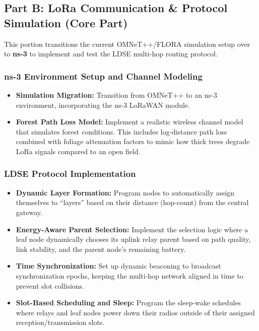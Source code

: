 \subsection*{Part B: LoRa Communication \& Protocol Simulation (Core Part)}

This portion transitions the current OMNeT++/FLORA simulation setup over to
\textbf{ns-3} to implement and test the LDSE multi-hop routing protocol.

\subsubsection{ns-3 Environment Setup and Channel Modeling}

\begin{itemize}
    \item \textbf{Simulation Migration:} Transition from OMNeT++ to an ns-3
    environment, incorporating the ns-3 LoRaWAN module.

    \item \textbf{Forest Path Loss Model:} Implement a realistic wireless
    channel model that simulates forest conditions. This includes
    log-distance path loss combined with foliage attenuation factors to
    mimic how thick trees degrade LoRa signals compared to an open field.
\end{itemize}

\subsubsection{LDSE Protocol Implementation}

\begin{itemize}
    \item \textbf{Dynamic Layer Formation:} Program nodes to automatically
    assign themselves to ``layers'' based on their distance (hop-count)
    from the central gateway.

    \item \textbf{Energy-Aware Parent Selection:} Implement the selection
    logic where a leaf node dynamically chooses its uplink relay parent
    based on path quality, link stability, and the parent node's remaining
    battery.

    \item \textbf{Time Synchronization:} Set up dynamic beaconing to
    broadcast synchronization epochs, keeping the multi-hop network aligned
    in time to prevent slot collisions.

    \item \textbf{Slot-Based Scheduling and Sleep:} Program the sleep-wake
    schedules where relays and leaf nodes power down their radios outside
    of their assigned reception/transmission slots.
\end{itemize}

